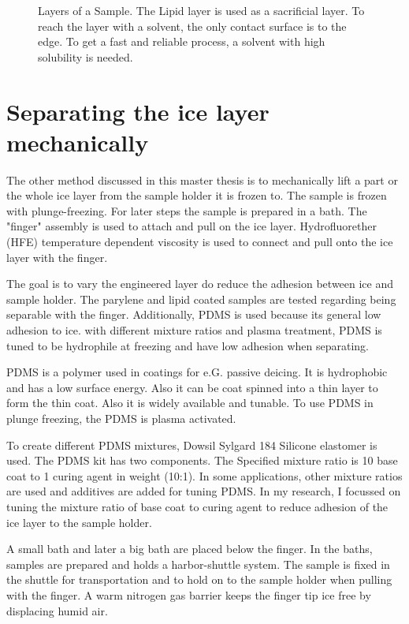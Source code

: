 \begin{figure}[hbt!]
	\centering
	
	\caption{Layers of a Sample. The Lipid layer is used as a sacrificial layer. To reach the layer with a solvent, the only contact surface is to the edge. To get a fast and reliable process, a solvent with high solubility is needed.}
	\label{fig:sacrificial layer}
\end{figure}

\section{Separating the ice layer mechanically}

The other method discussed in this master thesis is to mechanically lift a part or the whole ice layer from the sample holder it is frozen to. The sample is frozen with plunge-freezing. For later steps the sample is prepared in a bath. The "finger" assembly is used to attach and pull on the ice layer. Hydrofluorether (HFE) temperature dependent viscosity is used to connect and pull onto the ice layer with the finger.

The goal is to vary the engineered layer do reduce the adhesion between ice and sample holder. The parylene and lipid coated samples are tested regarding being separable with the finger. Additionally, PDMS is used because its general low adhesion to ice. with different mixture ratios and plasma treatment, PDMS is tuned to be hydrophile at freezing and have low adhesion when separating.


PDMS is a polymer used in coatings for e.G. passive deicing. It is hydrophobic and has a low surface energy. Also it can be coat spinned into a thin layer to form the thin coat. Also it is widely available and tunable. To use PDMS in plunge freezing, the PDMS is plasma activated.

To create different PDMS mixtures, Dowsil Sylgard 184 Silicone elastomer is used\cite{DOW.}. The PDMS kit has two components. The Specified mixture ratio is 10 base coat to 1 curing agent in weight (10:1). In some applications, other mixture ratios are used and additives are added for tuning PDMS. In my research, I focussed on tuning the mixture ratio of base coat to curing agent to reduce adhesion of the ice layer to the sample holder. 



A small bath and later a big bath are placed below the finger. In the baths, samples are prepared and holds a harbor-shuttle system. The sample is fixed in the shuttle for transportation and to hold on to the sample holder when pulling with the finger. A warm nitrogen gas barrier keeps the finger tip ice free by displacing humid air.

